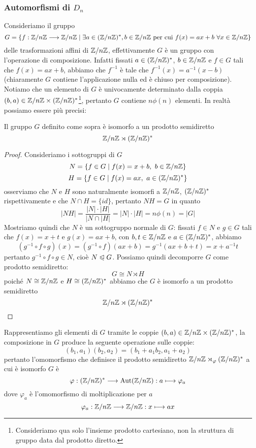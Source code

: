 \documentclass[11pt]{scrartcl}
\begin{document}
\subsubsection{Automorfismi di $D_n$}

Consideriamo il gruppo 
\[
    G = \{f: {\mathbb Z}/n{\mathbb Z}\longrightarrow{\mathbb Z}/n{\mathbb Z}\mid \exists a \in ({\mathbb Z}/n{\mathbb Z})^*, b \in {\mathbb Z}/n{\mathbb Z}\text{ per cui }
    f(x) = ax + b~\forall x \in {\mathbb Z}/n{\mathbb Z}\}
\]
delle trasformazioni affini di ${\mathbb Z}/n{\mathbb Z}$, effettivamente $G$ è un gruppo con 
l'operazione di composizione. Infatti fissati $a \in ({\mathbb Z}/n{\mathbb Z})^*$, $b \in {\mathbb Z}/n{\mathbb Z}$ e
$f \in G$ tali che $f(x) = ax + b$, abbiamo che $f^{-1}$ è tale che 
$f^{-1}(x) = a^{-1}(x - b)$ (chiaramente $G$ contiene l'applicazione nulla 
ed è chiuso per composizione). Notiamo che un elemento di $G$ è univocamente
determinato dalla coppia $(b, a) \in {\mathbb Z}/n{\mathbb Z} \times ({\mathbb Z}/n{\mathbb Z})^*$\footnote{
    Consideriamo qua solo l'insieme prodotto cartesiano, non la struttura di 
    gruppo data dal prodotto diretto.
}, pertanto $G$
contiene $n\phi(n)$ elementi. In realtà possiamo essere più precisi:

\begin{proposition}
    Il gruppo $G$ definito come sopra è isomorfo a un prodotto semidiretto 
    \[
        {\mathbb Z}/n{\mathbb Z} \rtimes ({\mathbb Z}/n{\mathbb Z})^*
    \]
\end{proposition}

\begin{proof}
    Consideriamo i sottogruppi di $G$
    \[
        N = \{f \in G\mid f(x) = x + b,~b \in {\mathbb Z}/n{\mathbb Z}\}
    \]
    \[
        H = \{f \in G\mid f(x) = ax,~a \in ({\mathbb Z}/n{\mathbb Z})^*\}
    \]
    osserviamo che $N$ e $H$ sono naturalmente isomorfi a ${\mathbb Z}/n{\mathbb Z}$, $({\mathbb Z}/n{\mathbb Z})^*$ 
    rispettivamente e che $N \cap H = \{id\}$, pertanto $NH = G$ in quanto 
    \[
        |NH| = \frac{|N|\cdot|H|}{|N\cap|H|} = |N|\cdot|H| = n\phi(n) = |G|
    \]
    Mostriamo quindi che $N$ è un sottogruppo normale di $G$: fissati $f \in N$
    e $g \in G$ tali che $f(x) = x + t$ e $g(x) = ax + b$, con $b, t \in {\mathbb Z}/n{\mathbb Z}$ e 
    $a \in ({\mathbb Z}/n{\mathbb Z})^*$, abbiamo
    \[
        (g^{-1}\circ f \circ g)(x) = (g^{-1}\circ f)(ax + b) = g^{-1}(ax + b + t) = 
        x + a^{-1}t
    \]
        pertanto $g^{-1}\circ f\circ g \in N$, cioè $N\trianglelefteqslant G$.
    Possiamo quindi decomporre $G$ come prodotto semidiretto:
    \[
        G \cong N\rtimes H
    \]
    poiché $N \cong {\mathbb Z}/n{\mathbb Z}$ e $H \cong ({\mathbb Z}/n{\mathbb Z})^*$ abbiamo che $G$ è isomorfo a un
    prodotto semidiretto 
    \[
        {\mathbb Z}/n{\mathbb Z} \rtimes ({\mathbb Z}/n{\mathbb Z})^*
    \]
\end{proof}

Rappresentiamo gli elementi di $G$ tramite le coppie $(b, a) \in {\mathbb Z}/n{\mathbb Z}\times ({\mathbb Z}/n{\mathbb Z})^*$,
la composizione in $G$ produce la seguente operazione sulle coppie:
\[
    (b_1, a_1)(b_2, a_2) = (b_1 + a_1b_2, a_1 + a_2)
\]
pertanto l'omomorfismo che definisce il prodotto semidiretto ${\mathbb Z}/n{\mathbb Z} \rtimes_{\varphi}({\mathbb Z}/n{\mathbb Z})^*$
a cui è isomorfo $G$ è 
\[
    \varphi: ({\mathbb Z}/n{\mathbb Z})^* \longrightarrow \operatorname{Aut}({\mathbb Z}/n{\mathbb Z}): a \longmapsto \varphi_a
\]
dove $\varphi_a$ è l'omomorfismo di moltiplicazione per $a$
\[
    \varphi_a :{\mathbb Z}/n{\mathbb Z} \longrightarrow {\mathbb Z}/n{\mathbb Z}: x \longmapsto ax
\]
\end{document}

